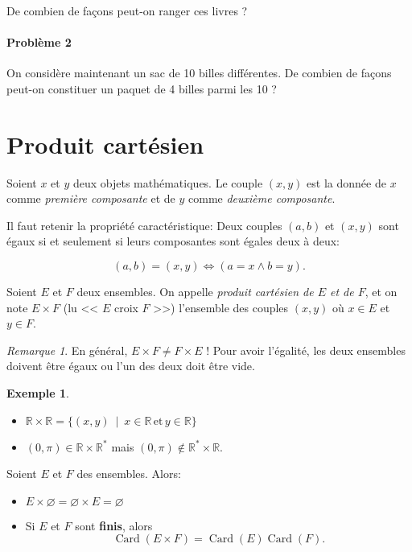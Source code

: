 \documentclass[11pt]{article}
\newcommand{\R}{\mathbb R}
\DeclareMathOperator{\Card}{\mathrm{Card}}
\theoremstyle{definition}
\newtheorem{exe}{Exemple}
\theoremstyle{remark}
\newtheorem{rem}{Remarque}
\begin{document}
De combien de façons peut-on ranger ces livres ?



\paragraph{Problème 2} On considère maintenant un sac de 10 billes différentes. De combien de façons peut-on constituer un paquet de 4 billes parmi les 10 ?

\section{Produit cartésien}

\begin{defn}
	Soient $x$ et $y$ deux objets mathématiques. Le couple $(x,y)$ est la donnée de $x$ comme \textit{première composante} et de $y$ comme \textit{deuxième composante}.
	
	Il faut retenir la propriété caractéristique:
	Deux couples $(a,b)$ et $(x,y)$ sont égaux si et seulement si leurs composantes sont égales deux à deux:
	
	\[
	(a,b) = (x,y) \Longleftrightarrow (a=x\land b=y).
	\]
\end{defn}

\begin{defn}
Soient $E$ et $F$ deux ensembles. On appelle \textit{produit cartésien de $E$ et de $F$}, et on note $E\times F$ (lu << $E$ croix $F$ >>) l'ensemble des couples $(x,y)$ où $x\in E$ et $y\in F$.
\end{defn}

\begin{rem}
En général, $E\times F\neq F\times E$ ! Pour avoir l'égalité, les deux ensembles doivent être égaux ou l'un des deux doit être vide.
\end{rem}

\begin{exe}\leavevmode
\begin{itemize}
\item $\R\times\R = \{(x,y)\ \mid\ x\in\R\,\text{et}\,y\in\R \}$
\item $(0,\pi)\in\R\times\R^*$ mais $(0,\pi)\not\in \R^*\times\R$.
\end{itemize}
\end{exe}

\begin{prop}
	Soient $E$ et $F$ des ensembles. Alors:
	\begin{itemize}
		\item $E\times\varnothing=\varnothing\times E=\varnothing$
		\item Si $E$ et $F$ sont \textbf{finis}, alors
		\[
		\Card(E\times F) = \Card(E)\Card(F). 
		\]
	\end{itemize}
\end{prop}
\end{document}
